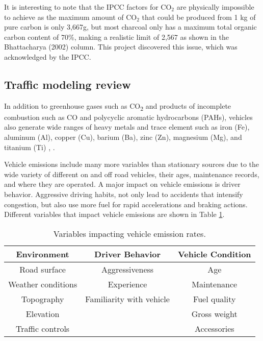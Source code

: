 It is interesting to note that the IPCC factors for CO$_{2}$ are physically impossible to achieve as the maximum amount of CO$_{2}$ that could be produced from 1 kg of pure carbon is only 3,667g, but most charcoal only has a maximum total organic carbon content of 70\%, making a realistic limit of 2,567 as shown in the Bhattacharya (2002) column.  This project discovered this issue, which was acknowledged by the IPCC.

\subsection{Traffic modeling review}
In addition to greenhouse gases such as CO\textsubscript{2} and products of incomplete combustion such as CO and polycyclic aromatic hydrocarbons (PAHs), vehicles also generate wide ranges of heavy metals and trace element such as iron (Fe), aluminum (Al), copper (Cu), barium (Ba), zinc (Zn), magnesium (Mg), and titanium (Ti) \cite{Schauer2002}, \cite{Schauer2006}. 

Vehicle emissions include many more variables than stationary sources due to the wide variety of different on and off road vehicles, their ages, maintenance records, and where they are operated. A major impact on vehicle emissions is driver behavior. Aggressive driving habits, not only lead to accidents that intensify congestion, but also use more fuel for rapid accelerations and braking actions. Different variables that impact vehicle emissions are shown in Table \ref{tb:vehvariables}.  

\begin{table}[]
\centering
\caption{Variables impacting vehicle emission rates.}
\label{tb:vehvariables}
\begin{tabular}{@{}ccc@{}}
\toprule
\textbf{Environment} & \textbf{Driver Behavior} & \textbf{Vehicle Condition} \\ \midrule
Road surface & Aggressiveness & Age \\
Weather conditions & Experience & Maintenance \\
Topography & Familiarity with vehicle & Fuel quality \\
Elevation &  & Gross weight \\
Traffic controls &  & Accessories \\ \bottomrule
\end{tabular}
\end{table}

